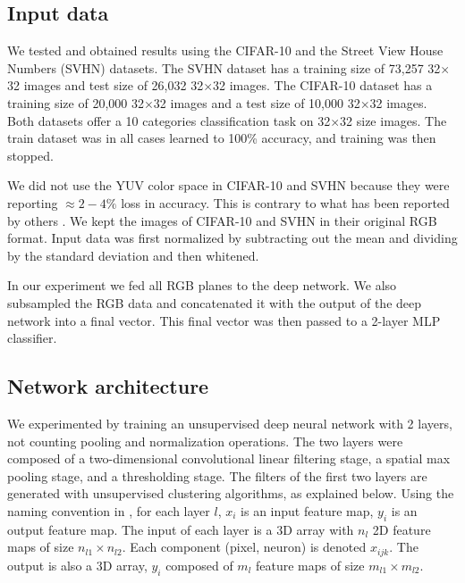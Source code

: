 \documentclass{article} %
\begin{document}
\subsection{Input data}

We tested and obtained results using the CIFAR-10 \cite{krizhevsky_learning_2009} and the Street View House Numbers (SVHN) \cite{netzer_reading_2011} datasets.
The SVHN dataset has a training size of 73,257 32$\times$32 images and test size of 26,032 32$\times$32 images.
The CIFAR-10 dataset has a training size of 20,000 32$\times$32 images and a test size of 10,000 32$\times$32 images.
Both datasets offer a 10 categories classification task on 32$\times$32 size images.
The train dataset was in all cases learned to 100\% accuracy, and training was then stopped. 

We did not use the YUV color space in CIFAR-10 and SVHN because they were reporting $\approx 2-4\%$ loss in accuracy.
This is contrary to what has been reported by others \cite{jarrett_what_2009}.
We kept the images of CIFAR-10 and SVHN in their original RGB format.
Input data was first normalized by subtracting out the mean and dividing by the standard deviation and then whitened.

In our experiment we fed all RGB planes to the deep network.
We also subsampled the RGB data and concatenated it with the output of the deep network into a final vector.
This final vector was then passed to a 2-layer MLP classifier.

\subsection{Network architecture}
\label{sec-net-arch}

We experimented by training an unsupervised deep neural network with 2 layers, not counting pooling and normalization operations.
The two layers were composed of a two-dimensional convolutional linear filtering stage, a spatial max pooling stage, and a thresholding stage. 
The filters of the first two layers are generated with unsupervised clustering algorithms, as explained below. 
Using the naming convention in \cite{lecun_convolutional_2010}, for each layer $l$, $x_i$ is an input feature map, $y_i$ is an output feature map.
The input of each layer is a 3D array with $n_l$ 2D feature maps of size $n_{l1} \times n_{l2}$.
Each component (pixel, neuron) is denoted $x_{ijk}$.
The output is also a 3D array, $y_i$ composed of $m_l$ feature maps of size $m_{l1} \times m_{l2}$.
\end{document}

